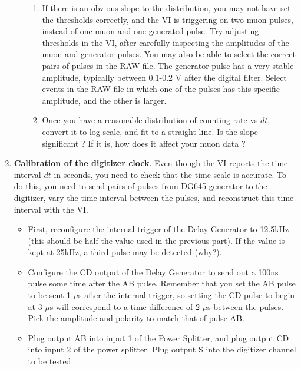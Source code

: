 \documentclass{../lab}
\begin{document}
\begin{enumerate}
\begin{itemize}
\begin{enumerate}
            \item If there is an obvious slope to the distribution, you may not have set the thresholds correctly, and the VI is triggering on two muon pulses, instead of one muon and one generated pulse. Try adjusting thresholds in the VI, after carefully inspecting the amplitudes of the muon and generator pulses. You may also be able to select the correct pairs of pulses in the RAW file. The generator pulse has a very stable amplitude, typically between 0.1-0.2 V after the digital filter. Select events in the RAW file in which one of the pulses has this specific amplitude, and the other is larger.
    
            \item Once you have a reasonable distribution of counting rate vs $dt$, convert it to log scale, and fit to a straight line. Is the slope significant ? If it is, how does it affect your muon data ?
        \end{enumerate}

    \end{itemize}

    \item \textbf{Calibration of the digitizer clock}. Even though the VI reports the time interval $dt$ in seconds, you need to check that the time scale is accurate. To do this, you need to send pairs of pulses from DG645 generator to the digitizer, vary the time interval between the pulses, and reconstruct this time interval with the VI.

    \begin{itemize}
        \item First, reconfigure the internal trigger of the Delay Generator to 12.5kHz (this should be half the value used in the previous part). If the value is kept at 25kHz, a third pulse may be detected (why?).

        \item Configure the CD output of the Delay Generator to send out a 100ns pulse some time after the AB pulse. Remember that you set the AB pulse to be sent 1 $\mu$s after the internal trigger, so setting the CD pulse to begin at 3 $\mu$s will correspond to a time difference of 2 $\mu$s between the pulses. Pick the amplitude and polarity to match that of pulse AB.

        \item Plug output AB into input 1 of the Power Splitter, and plug output CD into input 2 of the power splitter. Plug output S into the digitizer channel to be tested.


\end{itemize}
\end{enumerate}
\end{document}
